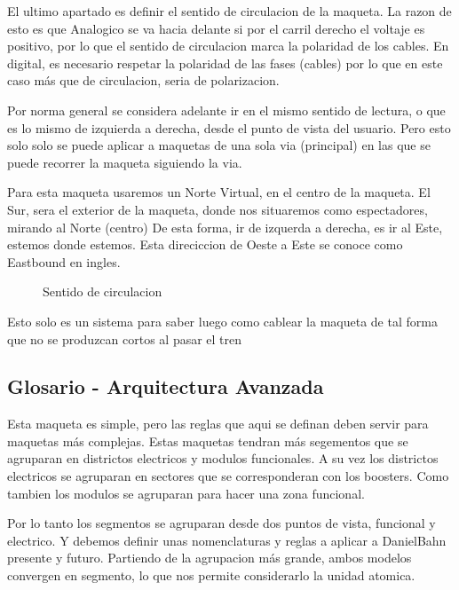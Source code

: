 El ultimo apartado es definir el sentido de circulacion de la maqueta.
La razon de esto es que Analogico se va hacia delante si por el carril derecho
el voltaje es positivo, por lo que el sentido de circulacion marca la polaridad
de los cables. En digital, es necesario respetar la polaridad de las fases (cables)
por lo que en este caso más que de circulacion, seria de polarizacion.

Por norma general se considera adelante ir en el mismo sentido de lectura, o que es
lo mismo de izquierda a derecha, desde el punto de vista del usuario. Pero esto solo
solo se puede aplicar a maquetas de una sola via (principal) en las que se puede
recorrer la maqueta siguiendo la via.

Para esta maqueta usaremos un Norte Virtual, en el centro de la maqueta. El Sur, sera
el exterior de la maqueta, donde nos situaremos como espectadores, mirando al Norte (centro)
De esta forma, ir de izquerda a derecha, es ir al Este, estemos donde estemos.
Esta direciccion de Oeste a Este se conoce como Eastbound en ingles.

\begin{figure}[H]
    \centering
    
    \caption{Sentido de circulacion}
    \label{fig:Sentidos}
\end{figure}

Esto solo es un sistema para saber luego como cablear la maqueta de tal forma
que no se produzcan cortos al pasar el tren 

\subsection{Glosario - Arquitectura Avanzada}
Esta maqueta es simple, pero las reglas que aqui se definan deben servir para maquetas más complejas. Estas maquetas tendran más segementos que se agruparan en districtos electricos y modulos funcionales. A su vez los districtos electricos se agruparan en sectores que se corresponderan con los boosters. Como tambien los modulos se agruparan para hacer una zona funcional.

Por lo tanto los segmentos se agruparan desde dos puntos de vista, funcional y electrico. Y debemos definir unas nomenclaturas y reglas a aplicar a DanielBahn presente y futuro. Partiendo de la agrupacion más grande, ambos modelos convergen en segmento, lo que nos permite considerarlo la unidad atomica. 

